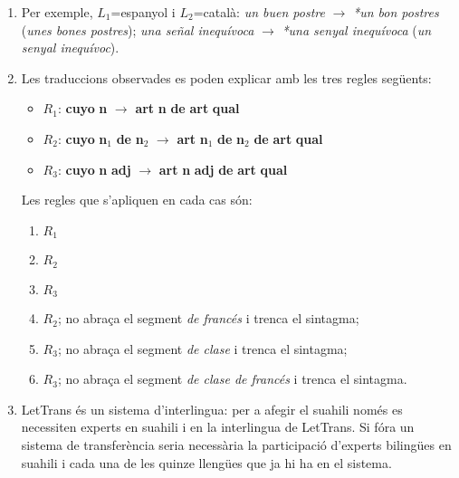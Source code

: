 \begin{enumerate}
\item Per exemple, $L_1$=espanyol i $L_2$=català: \emph{un buen
    postre} $\rightarrow$ \emph{*un bon postres} (\emph{unes bones
    postres}); \emph{una señal inequívoca} $\rightarrow$ \emph{*una
    senyal inequívoca} (\emph{un senyal inequívoc}).

\item Les traduccions observades es poden explicar amb les tres regles
  següents:
  \begin{itemize}
  \item $R_1$: {\bf cuyo} {\bf n} $\rightarrow$ {\bf art} {\bf n} {\bf
      de} {\bf art} {\bf qual}
  \item $R_2$: {\bf cuyo} {\bf n}$_1$ {\bf de} {\bf n}$_2$
    $\rightarrow$ {\bf art} {\bf n}$_1$ {\bf de} {\bf n}$_2$ {\bf de}
    {\bf art} {\bf qual}
  \item $R_3$: {\bf cuyo} {\bf n} {\bf adj} $\rightarrow$ {\bf art}
    {\bf n} {\bf adj} {\bf de} {\bf art} {\bf qual}
  \end{itemize}
  Les regles que s'apliquen en cada cas són:
  \begin{enumerate}
  \item $R_1$
  \item $R_2$
  \item $R_3$
  \item $R_2$; no abraça el segment \emph{de francés} i trenca el
    sintagma;
  \item $R_3$; no abraça el segment \emph{de clase} i trenca el
    sintagma;
  \item $R_3$; no abraça el segment \emph{de clase de francés} i
    trenca el sintagma.
  \end{enumerate}

\item LetTrans és un sistema d'interlingua: per a afegir el suahili
  només es necessiten experts en suahili i en la interlingua de
  LetTrans. Si fóra un sistema de transferència seria necessària la
  participació d'experts bilingües en suahili i cada una de les quinze
  llengües que ja hi ha en el sistema.


\end{enumerate}
